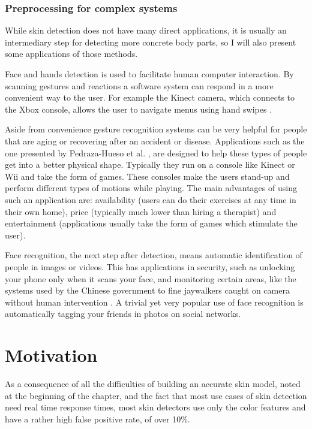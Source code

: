\documentclass[12pt]{report}
\begin{document}
	\subsubsection{Preprocessing for complex systems}
	While skin detection does not have many direct applications, it is usually an intermediary step for detecting more concrete body parts, so I will also present some applications of those methods.
	
	Face and hands detection is used to facilitate human computer interaction. By scanning gestures and reactions a software system can respond in a more convenient way to the user. For example the Kinect camera, which connects to the Xbox console, allows the user to navigate menus using hand swipes \cite{kinect_control}. 
	
	Aside from convenience gesture recognition systems can be very helpful for people that are aging or recovering after an accident or disease. Applications such as the one presented by Pedraza-Hueso et al. \cite{rehabilitation_kinect}, are designed to help these types of people get into a better physical shape. Typically they run on a console like Kinect or Wii and take the form of games. These consoles make the users stand-up and perform different types of motions while playing. The main advantages of using such an application are: availability (users can do their exercises at any time in their own home), price (typically much lower than hiring a therapist) and entertainment (applications usually take the form of games which stimulate the user).
	
	Face recognition, the next step after detection, means automatic identification of people in images or videos\cite{detecting_faces_a_survey}. This has applications in security, such as unlocking your phone only when it scans your face, and monitoring certain areas, like the systems used by the Chinese government to fine jaywalkers caught on camera without human intervention \cite{jaywalkers_china}. A trivial yet very popular use of face recognition is automatically tagging your friends in photos on social networks.
	
	\section{Motivation}
	As a consequence of all the difficulties of building an accurate skin model, noted at the beginning of the chapter, and the fact that most use cases of skin detection need real time response times, most skin detectors use only the color features and have a rather high false positive rate, of over 10\%\cite{survey_skin_color_modeling}. 
	
\end{document}

